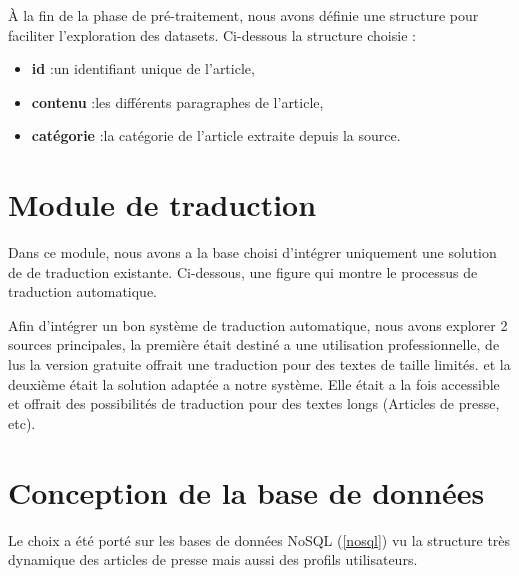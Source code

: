             À la fin de la phase de pré-traitement, nous avons définie une structure pour faciliter l'exploration des datasets. Ci-dessous la structure choisie :
            \begin{itemize}
                \item{\textbf{id} :}un identifiant unique de l'article,
                \item{\textbf{contenu} :}les différents paragraphes de l'article,
                \item{\textbf{catégorie} :}la catégorie de l'article extraite depuis la source.
            \end{itemize}


























\section{Module de traduction}

Dans ce module, nous avons a la base choisi d'intégrer uniquement une solution de de traduction existante. Ci-dessous, une figure qui montre le processus de traduction automatique.




Afin d'intégrer un bon système de traduction automatique, nous avons explorer 2 sources principales, la première était destiné a une utilisation professionnelle, de lus la version gratuite offrait une traduction pour des textes de taille limités. et la deuxième était la solution adaptée a notre système. Elle était a la fois accessible et offrait des possibilités de traduction pour des textes longs (Articles de presse, etc). 



\section{Conception de la base de données}
Le choix a été porté sur les bases de données NoSQL (\autoref{nosql}) vu la structure très dynamique des articles de presse mais aussi des profils utilisateurs.

